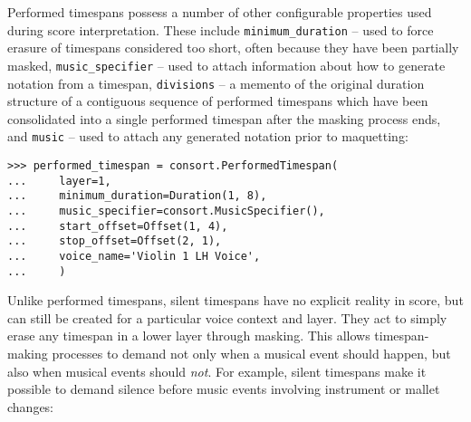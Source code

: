 \noindent Performed timespans possess a number of other configurable properties
used during score interpretation. These include \texttt{minimum\_duration} --
used to force erasure of timespans considered too short, often because they
have been partially masked, \texttt{music\_specifier} -- used to attach
information about how to generate notation from a timespan, \texttt{divisions}
-- a memento of the original duration structure of a contiguous sequence of
performed timespans which have been consolidated into a single performed
timespan after the masking process ends, and \texttt{music} -- used to attach
any generated notation prior to maquetting:

\begin{comment}
<abjad>
performed_timespan = consort.PerformedTimespan(
    layer=1,
    minimum_duration=Duration(1, 8),
    music_specifier=consort.MusicSpecifier(),
    start_offset=Offset(1, 4),
    stop_offset=Offset(2, 1),
    voice_name='Violin 1 LH Voice',
    )
</abjad>
\end{comment}

\begin{abjadbookoutput}
\begin{singlespacing}
\vspace{-0.5\baselineskip}
\begin{verbatim}
>>> performed_timespan = consort.PerformedTimespan(
...     layer=1,
...     minimum_duration=Duration(1, 8),
...     music_specifier=consort.MusicSpecifier(),
...     start_offset=Offset(1, 4),
...     stop_offset=Offset(2, 1),
...     voice_name='Violin 1 LH Voice',
...     )
\end{verbatim}
\end{singlespacing}
\end{abjadbookoutput}

\noindent Unlike performed timespans, silent timespans have no explicit reality
in score, but can still be created for a particular voice context and layer.
They act to simply erase any timespan in a lower layer through masking. This
allows timespan-making processes to demand not only when a musical event should
happen, but also when musical events should \emph{not}. For example, silent
timespans make it possible to demand silence before music events involving
instrument or mallet changes:

\begin{comment}
<abjad>
silent_timespan = consort.SilentTimespan(
    layer=2,
    start_offset=Offset(0, 1),
    stop_offset=Offset(1, 4),
    voice_name='Oboe Voice',
    )
</abjad>
\end{comment}

